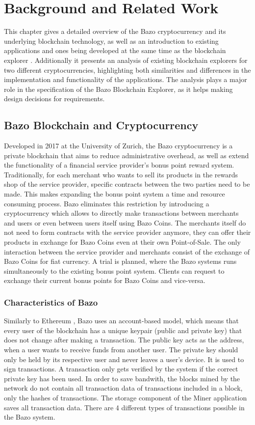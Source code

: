 \chapter{Background and Related Work}
This chapter gives a detailed overview of the Bazo cryptocurrency and its underlying blockchain technology, as well as an introduction to existing applications and ones being developed at the same time as the blockchain explorer . Additionally it presents an analysis of existing blockchain explorers for two different cryptocurrencies, highlighting both similarities and differences in the implementation and functionality of the applications. The analysis plays a major role in the specification of the Bazo Blockchain Explorer, as it helps making design decisions for requirements.

\section{Bazo Blockchain and Cryptocurrency}
Developed in 2017 at the University of Zurich, the Bazo cryptocurrency is a private blockchain that aims to reduce administrative overhead, as well as extend the functionality of a financial service provider's bonus point reward system. Traditionally, for each merchant who wants to sell its products in the rewards shop of the service provider, specific contracts between the two parties need to be made. This makes expanding the bonus point system a time and resource consuming process. Bazo eliminates this restriction by introducing a cryptocurrency which allows to directly make transactions between merchants and users or even between users itself using Bazo Coins. The merchants itself do not need to form contracts with the service provider anymore, they can offer their products in exchange for Bazo Coins even at their own Point-of-Sale. The only interaction between the service provider and merchants consist of the exchange of Bazo Coins for fiat currency. A trial is planned, where the Bazo systems runs simultaneously to the existing bonus point system. Clients can request to exchange their current bonus points for Bazo Coins and vice-versa.

\subsection{Characteristics of Bazo}
Similarly to Ethereum \cite{ethereum}, Bazo uses an account-based model, which means that every user of the blockchain has a unique keypair (public and private key) that does not change after making a transaction. The public key acts as the address, when a user wants to receive funds from another user. The private key should only be held by its respective user and never leaves a user's device. It is used to sign transactions. A transaction only gets verified by the system if the correct private key has been used. In order to save bandwith, the blocks mined by the network do not contain all transaction data of transactions included in a block, only the hashes of transactions. The storage component of the Miner application saves all transaction data. There are 4 different types of transactions possible in the Bazo system.


